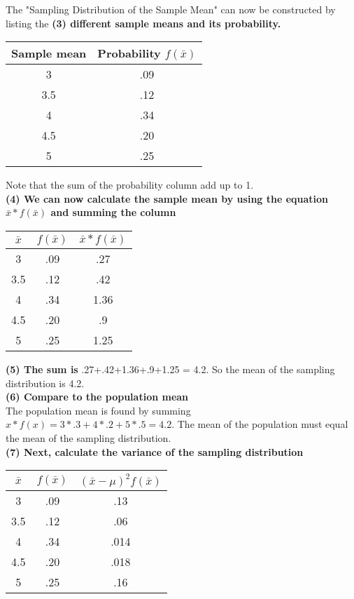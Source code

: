 \documentclass[12pt]{article}
\begin{document}
\noindent
The "Sampling Distribution of the Sample Mean" can now be constructed by listing the \textbf{(3) different sample means and its probability.}

\begin{center}
\begin{tabular}{ |c|c|} 
 \hline
 Sample mean & Probability $f(\bar{x})$\\ 
 \hline
 3 &.09\\
3.5 & .12 \\ 
 4 &.34 \\ 
4.5 &.20 \\
5 &.25\\ 
 \hline
\end{tabular}
\end{center}

Note that the sum of the probability column add up to 1. \\
\noindent \textbf{(4) We can now calculate the sample mean by using the equation $\bar{x}*f(\bar{x})$ and summing the column}

\begin{center}
\begin{tabular}{ |c|c|c|} 
 \hline
$\bar{x}$ & $f(\bar{x})$ & $\bar{x}*f(\bar{x})$\\ 
 \hline
 3 &.09&.27\\
3.5 & .12 &.42\\ 
 4 &.34 &1.36\\ 
4.5 &.20 &.9\\
5 &.25 & 1.25\\ 
 \hline
\end{tabular}
\end{center}

\noindent \textbf{(5) The sum is} .27+.42+1.36+.9+1.25 = 4.2. So the mean of the sampling distribution is 4.2. \\
\noindent \textbf{(6) Compare to the population mean}\\
The population mean is found by summing $x*f(x) = 3*.3+4*.2+5*.5 = 4.2$. The mean of the population must equal the mean of the sampling distribution. \\
\noindent \textbf{(7) Next, calculate the variance of the sampling distribution}


\begin{center}
\begin{tabular}{ |c|c|c|} 
 \hline
$\bar{x}$ & $f(\bar{x})$ &$(\bar{x}-\mu)^{2}f(\bar{x})$\\ 
 \hline
 3 &.09&.13\\
3.5 & .12 &.06 \\
 4 &.34 &.014\\
4.5 &.20 &.018\\
5 &.25 & .16\\
\hline
\end{tabular}
\end{center}
\end{document}
